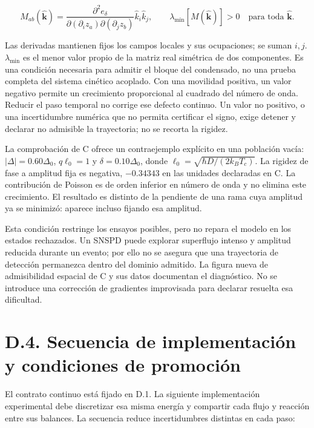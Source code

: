 \documentclass[
  spanish,
  10pt,
  a4paper,
]{article}
\begin{document}
\[
M_{ab}(\widehat{\mathbf k})=
\frac{\partial^2e_\delta}{\partial(\partial_i z_a)\partial(\partial_j z_b)}
\widehat k_i\widehat k_j,
\qquad \lambda_{\min}[M(\widehat{\mathbf k})]>0
\quad\text{para toda }\widehat{\mathbf k}.
\tag{D.36}
\]

Las derivadas mantienen fijos los campos locales y sus ocupaciones; se
suman \(i,j\). \(\lambda_{\min}\) es el menor valor propio de la matriz
real simétrica de dos componentes. Es una condición necesaria para
admitir el bloque del condensado, no una prueba completa del sistema
cinético acoplado. Con una movilidad positiva, un valor negativo permite
un crecimiento proporcional al cuadrado del número de onda. Reducir el
paso temporal no corrige ese defecto continuo. Un valor no positivo, o
una incertidumbre numérica que no permita certificar el signo, exige
detener y declarar no admisible la trayectoria; no se recorta la
rigidez.

La comprobación de C ofrece un contraejemplo explícito en una población
vacía: \(|\Delta|=0.60\Delta_0\), \(q\ell_0=1\) y
\(\delta=0.10\Delta_0\), donde \(\ell_0=\sqrt{\hbar D/(2k_BT_c)}\). La
rigidez de fase a amplitud fija es negativa, \(-0.34343\) en las
unidades declaradas en C. La contribución de Poisson es de orden
inferior en número de onda y no elimina este crecimiento. El resultado
es distinto de la pendiente de una rama cuya amplitud ya se minimizó:
aparece incluso fijando esa amplitud.

Esta condición restringe los ensayos posibles, pero no repara el modelo
en los estados rechazados. Un SNSPD puede explorar superflujo intenso y
amplitud reducida durante un evento; por ello no se asegura que una
trayectoria de detección permanezca dentro del dominio admitido. La
figura nueva de admisibilidad espacial de C y sus datos documentan el
diagnóstico. No se introduce una corrección de gradientes improvisada
para declarar resuelta esa dificultad.

\section{D.4. Secuencia de implementación y condiciones de
promoción}\label{d.4.-secuencia-de-implementaciuxf3n-y-condiciones-de-promociuxf3n}

El contrato continuo está fijado en D.1. La siguiente implementación
experimental debe discretizar esa misma energía y compartir cada flujo y
reacción entre sus balances. La secuencia reduce incertidumbres
distintas en cada paso:
\end{document}
